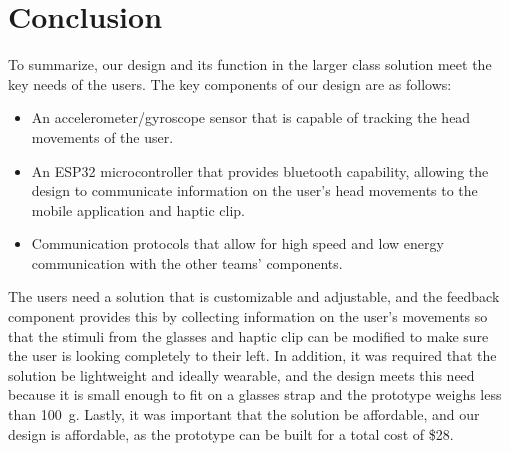 \chapter{Conclusion}
\label{chap:conclusion}

To summarize, our design and its function in the larger class solution meet the
key needs of the users. The key components of our design are as follows: 
\begin{itemize}
\item An accelerometer/gyroscope sensor that is capable of tracking the head
  movements of the user.
\item An ESP32 microcontroller that provides bluetooth capability, allowing the
  design to communicate information on the user’s head movements to the mobile
  application and haptic clip.
\item Communication protocols that allow for high speed and low energy
  communication with the other teams’ components.
\end{itemize}

The users need a solution that is customizable and adjustable, and the feedback
component provides this by collecting information on the user’s movements so
that the stimuli from the glasses and haptic clip can be modified to make sure
the user is looking completely to their left. In addition, it was required that
the solution be lightweight and ideally wearable, and the design meets this
need because it is small enough to fit on a glasses strap and the prototype
weighs less than \qty{100}{\g}. Lastly, it was important that the solution be
affordable, and our design is affordable, as the prototype can be built for a
total cost of \$28.

